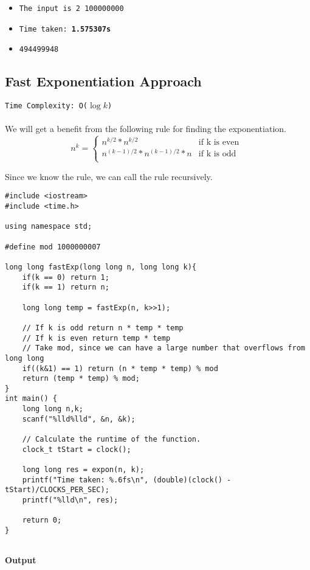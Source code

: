 \documentclass[12pt]{article}
\begin{document}
\begin{itemize}
  \item \texttt{The input is 2 100000000} 
  \item \texttt{Time taken: \textbf{1.575307s}} 
  \item \texttt{494499948}
\end{itemize}

\clearpage

\subsection{Fast Exponentiation Approach }
\texttt{Time Complexity: O($\log{k}$) } \\ \\
We will get a benefit from the following rule for finding the exponentiation.
\begin{equation}
  n^k =
  \begin{cases}
    n^{k/2} * n^{k/2} & \text{if k is even } \\
    n^{(k-1)/2} * n^{(k-1)/2} * n & \text{if k is odd } \\
  \end{cases}
\end{equation}

Since we know the rule, we can call the rule recursively.
\begin{verbatim}
#include <iostream>
#include <time.h>

using namespace std;

#define mod 1000000007

long long fastExp(long long n, long long k){
    if(k == 0) return 1;
    if(k == 1) return n;
    
    long long temp = fastExp(n, k>>1);
    
    // If k is odd return n * temp * temp
    // If k is even return temp * temp
    // Take mod, since we can have a large number that overflows from long long
    if((k&1) == 1) return (n * temp * temp) % mod
    return (temp * temp) % mod;
}
int main() {
    long long n,k;
    scanf("%lld%lld", &n, &k);
    
    // Calculate the runtime of the function.
    clock_t tStart = clock();
    
    long long res = expon(n, k);
    printf("Time taken: %.6fs\n", (double)(clock() - tStart)/CLOCKS_PER_SEC);
    printf("%lld\n", res);
    
    return 0;
}


\end{verbatim}
\textbf{Output}
\end{document}
